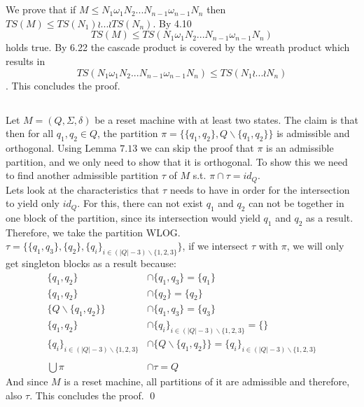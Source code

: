\documentclass[a4paper,12pt,numbers=noenddot]{scrreport}
\begin{document}

\chapter{}
\section{}
We prove that if $M \leq N_1 \omega_1 N_2 ... N_{n-1}\omega_{n-1} N_n$ then $TS(M) \leq TS(N_1) \wr ... \wr TS(N_n)$.
By 4.10 
$$TS(M) \leq TS(N_1 \omega_1 N_2 ... N_{n-1}\omega_{n-1} N_n)$$ holds true.
By 6.22 the cascade product is covered by the wreath product which results in 
$$TS(N_1 \omega_1 N_2 ... N_{n-1}\omega_{n-1} N_n) \leq TS(N_1 \wr ... \wr N_n)$$.
This concludes the proof.
\section{}
\section{}
Let $M = (Q, \Sigma, \delta)$ be a reset machine with at least two states. The claim is that then for all $q_1, q_2 \in Q$, the partition $\pi = \{\{q_1, q_2\}, Q\backslash\{q_1, q_2\}\}$ is admissible and orthogonal.
Using Lemma $7.13$ we can skip the proof that $\pi$ is an admissible partition, and we only need to show that it is orthogonal. To show this we need to find another admissible partition $\tau$ of $M$ s.t. $\pi \cap \tau = id_Q$.\\
Lets look at the characteristics that $\tau$ needs to have in order for the intersection to yield only $id_Q$. For this, there can not exist $q_1$ and $q_2$ can not be together in one block of the partition, since its intersection would yield $q_1$ and $q_2$ as a result. Therefore, we take the partition WLOG. $\tau = \{\{q_1, q_3\}, \{q_2\}, \{q_i\}_{i \in (|Q| - 3)\backslash \{1,2,3\}}\}$, if we intersect $\tau$ with $\pi$, we will only get singleton blocks as a result because:
\begin{align*}
    \{q_1, q_2\}                                    &\cap \{q_1, q_3\} = \{q_1\} \\
    \{q_1, q_2\}                                    &\cap \{q_2\} = \{q_2\} \\
    \{Q\backslash\{q_1, q_2\}\}                     &\cap \{q_1, q_3\} = \{q_3\}\\ 
    \{q_1, q_2\}                                    &\cap \{q_i\}_{i \in (|Q| - 3)\backslash \{1,2,3\}} = \{\}\\
    \{q_i\}_{i \in (|Q| - 3)\backslash \{1,2,3\}}   &\cap \{Q\backslash\{q_1, q_2\}\} = \{q_i\}_{i \in (|Q| - 3)\backslash \{1,2,3\}}\\
    ~\\
    \bigcup \pi &\cap \tau = Q  
\end{align*}
And since $M$ is a reset machine, all partitions of it are admissible and therefore, also $\tau$. This concludes the proof.
\qed
\end{document}
